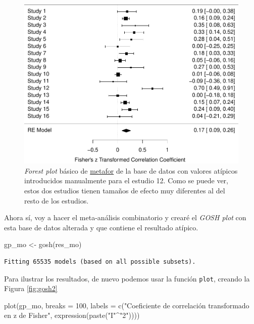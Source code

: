 \documentclass[
  bookmarksnumbered]{article}
\newenvironment{Shaded}{\begin{snugshade}}{\end{snugshade}}
\newcommand{\AttributeTok}[1]{\textcolor[rgb]{0.00,0.34,0.68}{#1}}
\newcommand{\DecValTok}[1]{\textcolor[rgb]{0.69,0.50,0.00}{#1}}
\newcommand{\FunctionTok}[1]{\textcolor[rgb]{0.39,0.29,0.61}{#1}}
\newcommand{\NormalTok}[1]{\textcolor[rgb]{0.12,0.11,0.11}{#1}}
\newcommand{\OtherTok}[1]{\textcolor[rgb]{0.00,0.43,0.16}{#1}}
\newcommand{\SpecialCharTok}[1]{\textcolor[rgb]{0.24,0.68,0.91}{#1}}
\newcommand{\StringTok}[1]{\textcolor[rgb]{0.75,0.01,0.01}{#1}}
\begin{document}
\begin{figure}
\centering
\includegraphics{Meta-analysis_files/figure-latex/for-plot-mo-1.pdf}
\caption{\label{fig:for-plot-mo}\emph{Forest plot} básico de \href{https://www.metafor-project.org/doku.php}{metafor} de la base de datos con valores atípicos introducidos manualmente para el estudio 12. Como se puede ver, estos dos estudios tienen tamaños de efecto muy diferentes al del resto de los estudios.}
\end{figure}

Ahora sí, voy a hacer el meta-análisis combinatorio y crearé el \emph{GOSH plot} con esta base de datos alterada y que contiene el resultado atípico.

\begin{Shaded}
\begin{Highlighting}[]
\NormalTok{gp\_mo }\OtherTok{\textless{}{-}} \FunctionTok{gosh}\NormalTok{(res\_mo)}
\end{Highlighting}
\end{Shaded}

\begin{verbatim}
Fitting 65535 models (based on all possible subsets).
\end{verbatim}

Para ilustrar los resultados, de nuevo podemos usar la función \texttt{plot}, creando la Figura \ref{fig:gosh2}

\begin{Shaded}
\begin{Highlighting}[]
\FunctionTok{plot}\NormalTok{(gp\_mo,  }
     \AttributeTok{breaks =} \DecValTok{100}\NormalTok{,}
     \AttributeTok{labels =} \FunctionTok{c}\NormalTok{(}\StringTok{"Coeficiente de correlación transformado en z de Fisher"}\NormalTok{, }
                \FunctionTok{expression}\NormalTok{(}\FunctionTok{paste}\NormalTok{(}\StringTok{"I"}\SpecialCharTok{\^{}}\StringTok{"2"}\NormalTok{))))}
\end{Highlighting}
\end{Shaded}
\end{document}
